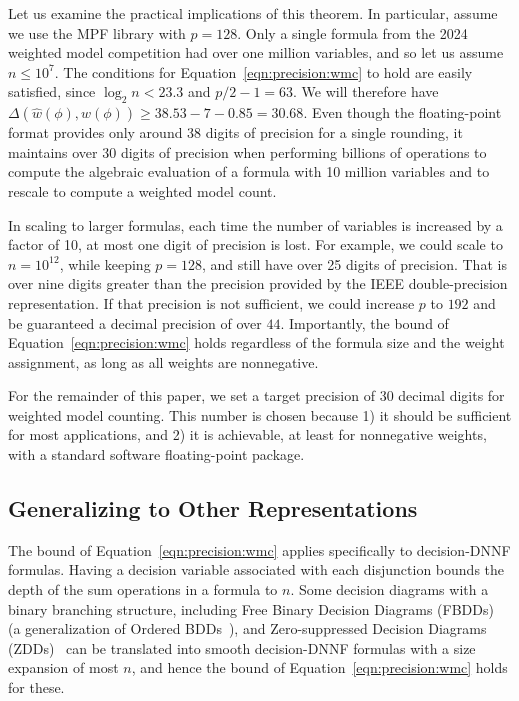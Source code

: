 \documentclass[letterpaper,USenglish,cleveref, autoref, thm-restate]{lipics-v2021}
\newcommand{\approximate}[1]{\hat{#1}}
\newcommand{\approxw}{\approximate{w}}
\newcommand{\digitprecision}{\Delta}
\begin{document}
Let us examine the practical implications of this theorem.  In
particular, assume we use the MPF library with $p=128$.  Only a single
formula from the 2024 weighted model competition had over one million
variables, and so let us assume  $n \leq 10^7$.  The
conditions for Equation~\ref{eqn:precision:wmc} to hold are easily
satisfied, since $\log_2 n < 23.3$ and $p/2-1 = 63$.  We will
therefore have
$\digitprecision(\approxw(\phi), w(\phi)) \geq 38.53 - 7 - 0.85 = 30.68$.
Even though the floating-point format
provides only around 38 digits of precision for a single rounding,
it maintains over 30 digits of precision when performing billions of operations to
compute the algebraic evaluation of a formula with 10
million variables and to rescale to compute a weighted model count.

In scaling to larger formulas, each time
the number of variables is increased by a factor of 10, at most one
digit of precision is lost.  For example, we could scale to $n=10^{12}$, while keeping $p=128$, and still have over 25 digits of precision.  That is over nine digits greater than the precision
provided by the IEEE double-precision representation.  If that precision is not sufficient, we could increase $p$ to $192$ and be guaranteed a decimal precision of over $44$.
Importantly, the bound of Equation~\ref{eqn:precision:wmc} holds regardless of the formula size and the weight assignment, 
as long as all weights are nonnegative.

For the remainder of this paper, we set a target precision of 30 decimal digits for
weighted model counting.  This number is chosen because 1) it should be
sufficient for most applications, and 2) it
is achievable, at least for nonnegative weights, with a standard software floating-point package.

\subsection{Generalizing to Other Representations}
\label{sect:ddnnf}

The bound of Equation~\ref{eqn:precision:wmc} applies specifically to decision-DNNF
formulas.  Having a decision variable associated with each disjunction
bounds the depth of the sum operations in a formula to $n$.  Some
decision diagrams with a binary branching structure, including Free
Binary Decision Diagrams (FBDDs)~\cite{wegener:siam:2000}
(a generalization of Ordered BDDs~\cite{bryant:ieeetc:1986,knuth:bdd:2011}), and Zero-suppressed Decision
Diagrams (ZDDs)~\cite{minato:sttt:2001,minato:ijcai:2007} can be
translated into smooth decision-DNNF formulas with a size expansion of
most $n$, and hence the bound of Equation~\ref{eqn:precision:wmc}
holds for these.
\end{document}
